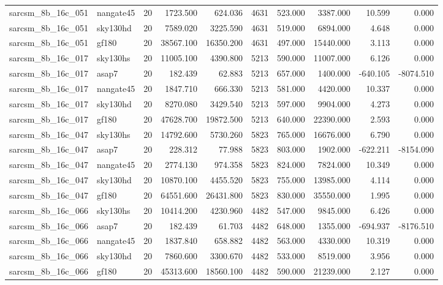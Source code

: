 \begin{tabular}{llrrrrrrrr}
sarcsm\_8b\_16c\_051 & nangate45 & 20 & 1723.500 & 624.036 & 4631 & 523.000 & 3387.000 & 10.599 & 0.000 \\
sarcsm\_8b\_16c\_051 & sky130hd & 20 & 7589.020 & 3225.590 & 4631 & 519.000 & 6894.000 & 4.648 & 0.000 \\
sarcsm\_8b\_16c\_051 & gf180 & 20 & 38567.100 & 16350.200 & 4631 & 497.000 & 15440.000 & 3.113 & 0.000 \\
sarcsm\_8b\_16c\_017 & sky130hs & 20 & 11005.100 & 4390.800 & 5213 & 590.000 & 11007.000 & 6.126 & 0.000 \\
sarcsm\_8b\_16c\_017 & asap7 & 20 & 182.439 & 62.883 & 5213 & 657.000 & 1400.000 & -640.105 & -8074.510 \\
sarcsm\_8b\_16c\_017 & nangate45 & 20 & 1847.710 & 666.330 & 5213 & 581.000 & 4420.000 & 10.337 & 0.000 \\
sarcsm\_8b\_16c\_017 & sky130hd & 20 & 8270.080 & 3429.540 & 5213 & 597.000 & 9904.000 & 4.273 & 0.000 \\
sarcsm\_8b\_16c\_017 & gf180 & 20 & 47628.700 & 19872.500 & 5213 & 640.000 & 22390.000 & 2.593 & 0.000 \\
sarcsm\_8b\_16c\_047 & sky130hs & 20 & 14792.600 & 5730.260 & 5823 & 765.000 & 16676.000 & 6.790 & 0.000 \\
sarcsm\_8b\_16c\_047 & asap7 & 20 & 228.312 & 77.988 & 5823 & 803.000 & 1902.000 & -622.211 & -8154.090 \\
sarcsm\_8b\_16c\_047 & nangate45 & 20 & 2774.130 & 974.358 & 5823 & 824.000 & 7824.000 & 10.349 & 0.000 \\
sarcsm\_8b\_16c\_047 & sky130hd & 20 & 10870.100 & 4455.520 & 5823 & 755.000 & 13985.000 & 4.114 & 0.000 \\
sarcsm\_8b\_16c\_047 & gf180 & 20 & 64551.600 & 26431.800 & 5823 & 830.000 & 35550.000 & 1.995 & 0.000 \\
sarcsm\_8b\_16c\_066 & sky130hs & 20 & 10414.200 & 4230.960 & 4482 & 547.000 & 9845.000 & 6.426 & 0.000 \\
sarcsm\_8b\_16c\_066 & asap7 & 20 & 182.439 & 61.703 & 4482 & 648.000 & 1355.000 & -694.937 & -8176.510 \\
sarcsm\_8b\_16c\_066 & nangate45 & 20 & 1837.840 & 658.882 & 4482 & 563.000 & 4330.000 & 10.319 & 0.000 \\
sarcsm\_8b\_16c\_066 & sky130hd & 20 & 7860.600 & 3300.670 & 4482 & 533.000 & 8519.000 & 3.956 & 0.000 \\
sarcsm\_8b\_16c\_066 & gf180 & 20 & 45313.600 & 18560.100 & 4482 & 590.000 & 21239.000 & 2.127 & 0.000 \\

\end{tabular}
